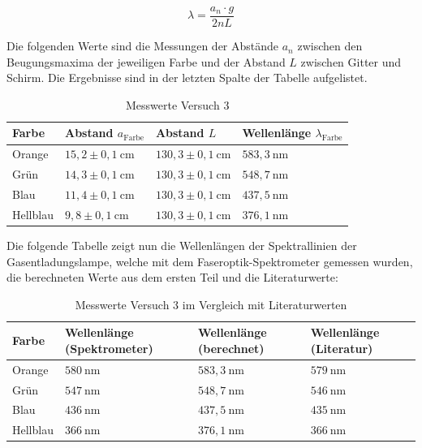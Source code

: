        \begin{equation}
            \lambda = \frac{a_{n} \cdot g}{2nL}
        \end{equation}

        Die folgenden Werte sind die Messungen der Abstände $a_{n}$ zwischen den Beugungsmaxima der jeweiligen Farbe und der Abstand $L$ zwischen Gitter und Schirm. Die Ergebnisse sind in der letzten Spalte der Tabelle aufgelistet.
        
        \begin{table}[H]
            \centering
            \caption{Messwerte Versuch 3}
            \vspace*{1em}
            \begin{tabular}{|l|l|l|l|}
                \hline
                Farbe & Abstand $a_{\text{Farbe}}$ & Abstand $L$ & Wellenlänge $\lambda_{\text{Farbe}}$\\
                \hline
                Orange & $15,2 \pm 0,1\ \mathrm{cm}$ & $130,3 \pm 0,1\ \mathrm{cm}$ & $583,3\ \mathrm{nm}$\\
                \hline
                Grün & $14,3 \pm 0,1\ \mathrm{cm}$ & $130,3 \pm 0,1\ \mathrm{cm}$ & $548,7\ \mathrm{nm}$\\
                \hline
                Blau & $11,4 \pm 0,1\ \mathrm{cm}$ & $130,3 \pm 0,1\ \mathrm{cm}$ & $437,5\ \mathrm{nm}$\\
                \hline
                Hellblau & $9,8 \pm 0,1\ \mathrm{cm}$ & $130,3 \pm 0,1\ \mathrm{cm}$ & $376,1\ \mathrm{nm}$\\
                \hline
            \end{tabular}
        \end{table}

        Die folgende Tabelle zeigt nun die Wellenlängen der Spektrallinien der Gasentladungslampe, welche mit dem Faseroptik-Spektrometer gemessen wurden, die berechneten Werte aus dem ersten Teil und die Literaturwerte:

        \begin{table}[H]
            \centering
            \caption{Messwerte Versuch 3 im Vergleich mit Literaturwerten}
            \vspace*{1em}
            \begin{tabular}{|l|l|l|l|}
                \hline
                Farbe & Wellenlänge (Spektrometer) & Wellenlänge (berechnet) & Wellenlänge (Literatur)\\
                \hline
                Orange & $580\ \mathrm{nm}$ & $583,3\ \mathrm{nm}$ & $579\ \mathrm{nm}$\\
                \hline
                Grün & $547\ \mathrm{nm}$ & $548,7\ \mathrm{nm}$ & $546\ \mathrm{nm}$\\
                \hline
                Blau & $436\ \mathrm{nm}$ & $437,5\ \mathrm{nm}$ & $435\ \mathrm{nm}$\\
                \hline
                Hellblau & $366\ \mathrm{nm}$ & $376,1\ \mathrm{nm}$ & $366\ \mathrm{nm}$\\
                \hline
            \end{tabular}
        \end{table}

